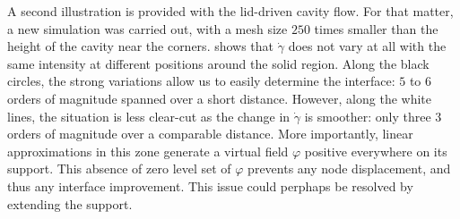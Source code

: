 \documentclass[11 pt]{report}
\begin{document}
A second illustration is provided with the lid-driven cavity flow. For that matter, a new simulation was carried out, with a mesh size $250$ times smaller than the height of the cavity near the corners.  shows that $\dot \gamma$ does not vary at all with the same intensity at different positions around the solid region. Along the black circles, the strong variations allow us to easily determine the interface: $5$ to $6$ orders of magnitude spanned over a short distance. However, along the white lines, the situation is less clear-cut as the change in $\dot \gamma$ is smoother: only three $3$ orders of magnitude over a comparable distance. More importantly, linear approximations in this zone generate a virtual field $\varphi$ positive everywhere on its support. This absence of zero level set of $\varphi$ prevents any node displacement, and thus any interface improvement. This issue could perphaps be resolved by extending the support.
\end{document}
